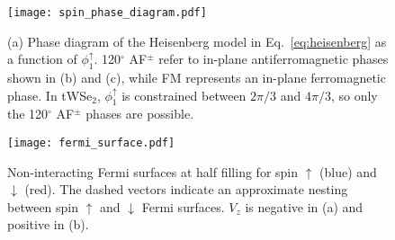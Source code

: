 \documentclass[aps,prx,floatfix,twocolumn]{revtex4-1}
\begin{document}
	\begin{figure}[t]
		\centering
		\texttt{[image: spin\_phase\_diagram.pdf]}
		\caption{(a) Phase diagram of the Heisenberg model in Eq.~\eqref{eq:heisenberg} as a function of $\phi_1^{\uparrow}$. 120$^{\circ}$ AF$^{\pm}$ refer to in-plane antiferromagnetic phases shown in (b) and (c), while FM represents an in-plane ferromagnetic phase.   In tWSe$_2$, $\phi_1^{\uparrow}$ is constrained between $2\pi/3$ and $4\pi/3$, so only the 120$^{\circ}$ AF$^{\pm}$ phases are possible.}
		\label{fig:spin}
	\end{figure}	
	
	
	\begin{figure}[t]
		\centering
		\texttt{[image: fermi\_surface.pdf]}
		\caption{ Non-interacting Fermi surfaces at half filling for spin $\uparrow$ (blue) and $\downarrow$ (red). The dashed vectors indicate an approximate nesting between spin $\uparrow$  and $\downarrow$ Fermi surfaces. $V_z$ is negative in (a) and positive in (b).  }	
		\label{fig:fermi}
	\end{figure}		
	
	
\end{document}
